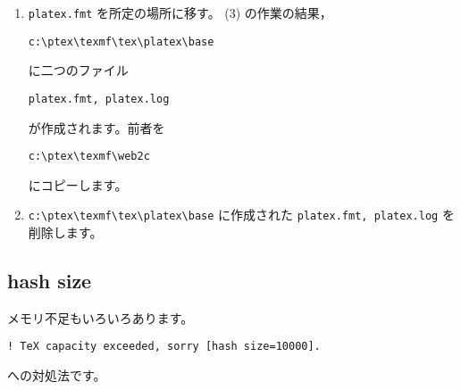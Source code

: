 \documentclass[fleqn,a4j]{jarticle}
\begin{document}
\begin{enumerate}[(1)]
    その上で，キーボードから
    \begin{jquote}%
\begin{verbatim}
ptex --ini platex.ltx
\end{verbatim}
    \end{jquote}
    と打ち込み，リターンキーを押します。
    いろいろなメッセージが流れますが，作業が終了すると，
    DOS Prompt が出ます。

    （注）ここで \LaTeX のバージョンが古いと
    \begin{jquote}%
\begin{verbatim}
!Latex source files more than 1 year old!.
1.573 ...LaTeX source files more than 1 year old!}
\end{verbatim}
    \end{jquote}
    などのメッセージが表れることがあります。
    このときは委細構わず，リターンキーを押せば作業は続行されます。
    もちろん，この機会に \LaTeX のバージョンアップをされることを
    お勧めしますが.....


\item \verb/platex.fmt/ を所定の場所に移す。
    (3) の作業の結果，
    \begin{jquote}%
\begin{verbatim}
c:\ptex\texmf\tex\platex\base
\end{verbatim}
    \end{jquote}
    に二つのファイル
    \begin{jquote}%
\begin{verbatim}
platex.fmt, platex.log
\end{verbatim}
    \end{jquote}
    が作成されます。前者を
    \begin{jquote}%
\begin{verbatim}
c:\ptex\texmf\web2c
\end{verbatim}
    \end{jquote}
    にコピーします。
\item \verb/c:\ptex\texmf\tex\platex\base/
    に作成された \texttt{platex.fmt, platex.log} を削除します。
\end{enumerate}

\subsection{hash size}
メモリ不足もいろいろあります。
\begin{jquote}
\begin{verbatim}
! TeX capacity exceeded, sorry [hash size=10000].
\end{verbatim}
\end{jquote}
への対処法です。
\end{document}
